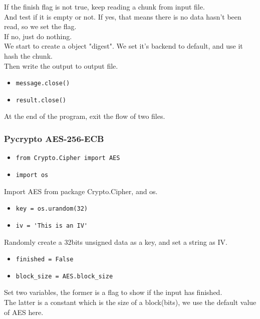 \documentclass{article}
\begin{document}
\noindent If the finish flag is not true, keep reading a chunk from input file.\\
And test if it is empty or not. If yes, that means there is no data hasn't been read, so we set the flag.\\
If no, just do nothing.\\
We start to create a object "digest". We set it's backend to default, and use it hash the chunk.\\
Then write the output to output file.

\begin{itemize}
\item \verb|message.close()|
\item \verb|result.close()|
\end{itemize}

\noindent At the end of the program, exit the flow of two files.\\

\subsubsection{Pycrypto AES-256-ECB}

\begin{itemize}
\item \verb|from Crypto.Cipher import AES|
\item \verb|import os|
\end{itemize}

\noindent Import AES from package  Crypto.Cipher, and os.

\begin{itemize}
\item \verb|key = os.urandom(32)|
\item \verb|iv = 'This is an IV'|
\end{itemize}

\noindent Randomly create a 32bits unsigned data as a key, and set a string as IV.

\begin{itemize}
\item \verb|finished = False|
\item \verb|block_size = AES.block_size|
\end{itemize}

\noindent Set two variables, the former is a flag to show if the input has finished.\\
The latter is a constant which is the size of a block(bits), we use the default value of AES here.
\end{document}
